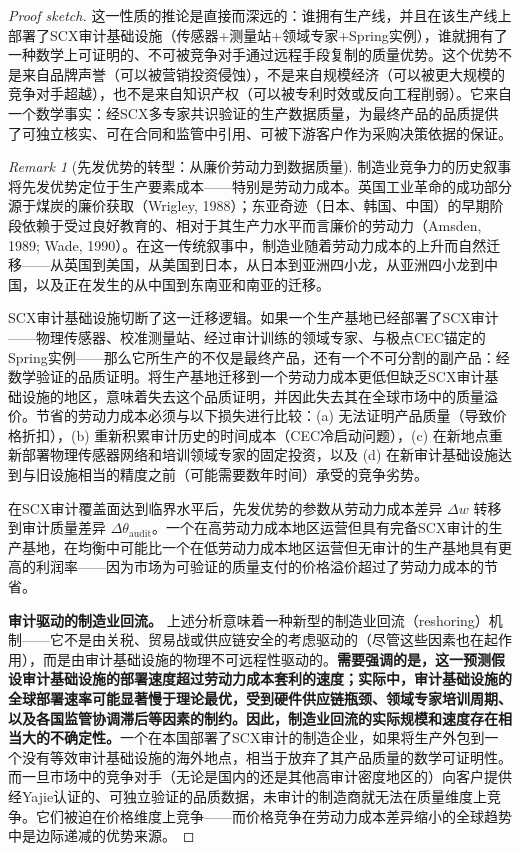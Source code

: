 \documentclass[12pt,a4paper]{ctexart}
\theoremstyle{definition}
\theoremstyle{remark}
\newtheorem{remark}{Remark}[section]
\begin{document}
\begin{proof}[Proof sketch]
这一性质的推论是直接而深远的：谁拥有生产线，并且在该生产线上部署了SCX审计基础设施（传感器+测量站+领域专家+Spring实例），谁就拥有了一种数学上可证明的、不可被竞争对手通过远程手段复制的质量优势。这个优势不是来自品牌声誉（可以被营销投资侵蚀），不是来自规模经济（可以被更大规模的竞争对手超越），也不是来自知识产权（可以被专利时效或反向工程削弱）。它来自一个数学事实：经SCX多专家共识验证的生产数据质量，为最终产品的品质提供了可独立核实、可在合同和监管中引用、可被下游客户作为采购决策依据的保证。

\begin{remark}[先发优势的转型：从廉价劳动力到数据质量]
制造业竞争力的历史叙事将先发优势定位于生产要素成本——特别是劳动力成本。英国工业革命的成功部分源于煤炭的廉价获取（Wrigley, 1988）；东亚奇迹（日本、韩国、中国）的早期阶段依赖于受过良好教育的、相对于其生产力水平而言廉价的劳动力（Amsden, 1989; Wade, 1990）。在这一传统叙事中，制造业随着劳动力成本的上升而自然迁移——从英国到美国，从美国到日本，从日本到亚洲四小龙，从亚洲四小龙到中国，以及正在发生的从中国到东南亚和南亚的迁移。

SCX审计基础设施切断了这一迁移逻辑。如果一个生产基地已经部署了SCX审计——物理传感器、校准测量站、经过审计训练的领域专家、与极点CEC锚定的Spring实例——那么它所生产的不仅是最终产品，还有一个不可分割的副产品：经数学验证的品质证明。将生产基地迁移到一个劳动力成本更低但缺乏SCX审计基础设施的地区，意味着失去这个品质证明，并因此失去其在全球市场中的质量溢价。节省的劳动力成本必须与以下损失进行比较：(a) 无法证明产品质量（导致价格折扣），(b) 重新积累审计历史的时间成本（CEC冷启动问题），(c) 在新地点重新部署物理传感器网络和培训领域专家的固定投资，以及 (d) 在新审计基础设施达到与旧设施相当的精度之前（可能需要数年时间）承受的竞争劣势。

在SCX审计覆盖面达到临界水平后，先发优势的参数从劳动力成本差异 $\Delta w$ 转移到审计质量差异 $\Delta \theta_{\text{audit}}$。一个在高劳动力成本地区运营但具有完备SCX审计的生产基地，在均衡中可能比一个在低劳动力成本地区运营但无审计的生产基地具有更高的利润率——因为市场为可验证的质量支付的价格溢价超过了劳动力成本的节省。
\end{remark}

\textbf{审计驱动的制造业回流。} 上述分析意味着一种新型的制造业回流（reshoring）机制——它不是由关税、贸易战或供应链安全的考虑驱动的（尽管这些因素也在起作用），而是由审计基础设施的物理不可远程性驱动的。\textbf{需要强调的是，这一预测假设审计基础设施的部署速度超过劳动力成本套利的速度；实际中，审计基础设施的全球部署速率可能显著慢于理论最优，受到硬件供应链瓶颈、领域专家培训周期、以及各国监管协调滞后等因素的制约。因此，制造业回流的实际规模和速度存在相当大的不确定性。}一个在本国部署了SCX审计的制造企业，如果将生产外包到一个没有等效审计基础设施的海外地点，相当于放弃了其产品质量的数学可证明性。而一旦市场中的竞争对手（无论是国内的还是其他高审计密度地区的）向客户提供经Yajie认证的、可独立验证的品质数据，未审计的制造商就无法在质量维度上竞争。它们被迫在价格维度上竞争——而价格竞争在劳动力成本差异缩小的全球趋势中是边际递减的优势来源。


\end{proof}
\end{document}
